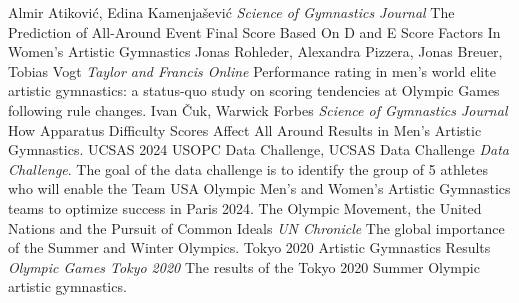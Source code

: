 \documentclass[12pt]{article}
\begin{document}
\begin{thebibliography}{999}
  Almir Atiković, Edina Kamenjašević \emph{Science of Gymnastics Journal}
 The Prediction of All-Around Event Final Score Based On D and E Score Factors In Women's Artistic 
 Gymnastics
  Jonas Rohleder, Alexandra Pizzera, Jonas Breuer, Tobias Vogt \emph{Taylor and Francis Online}
  Performance rating in men’s world elite artistic gymnastics: a status-quo study on scoring tendencies 
  at Olympic Games following rule changes.
  Ivan Čuk, Warwick Forbes \emph{Science of Gymnastics Journal}
  How Apparatus Difficulty Scores Affect All Around Results in Men's Artistic Gymnastics.
  UCSAS 2024 USOPC Data Challenge,
 UCSAS Data Challenge \emph{Data Challenge}.
   The goal of the data challenge is to identify the group of 5 athletes who will enable the Team USA 
   Olympic Men’s and Women’s Artistic Gymnastics teams to optimize success in Paris 2024.
   The Olympic Movement, the United Nations and the Pursuit of Common Ideals
   \emph{UN Chronicle}
   The global importance of the Summer and Winter Olympics.
   Tokyo 2020 Artistic Gymnastics Results
   \emph{Olympic Games Tokyo 2020}
   The results of the Tokyo 2020 Summer Olympic artistic gymnastics.
\end{thebibliography}


\end{document}
